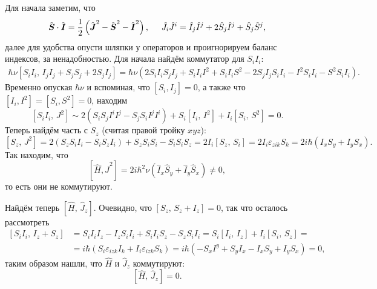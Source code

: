 Для начала заметим, что 
\begin{equation*}
    \hat{\mbox{\boldmath $S$}} \cdot \hat{\mbox{\boldmath $I$}} = \frac{1}{2} \left(
        \hat{\mbox{\boldmath $J$}}^2 - \hat{\mbox{\boldmath $S$}}^2 - \hat{\mbox{\boldmath $I$}}^2
    \right),
    \hspace{5 mm} 
    \hat{J}_i \hat{J}^i = \hat{I}_j \hat{I}^j + 2 \hat{S}_j \hat{I}^j + \hat{S}_j \hat{S}^j,
\end{equation*}
далее для удобства опусти шляпки у операторов и проигнорируем баланс индексов, за ненадобностью. Для начала найдём коммутатор для $S_i I_i$:
\begin{align*}
    \hbar \nu \left[
        S_i I_i,\, I_j I_j + S_j S_j + 2 S_j I_j
    \right] = \hbar \nu\left(
        2 S_i I_i S_j I_j + S_i I_i I^2 + S_i I_i S^2 - 
        2 S_j I_j S_i I_i - I^2 S_i I_i - S^2 S_i I_i
    \right).
\end{align*}
Временно опуская $\hbar \nu$ и вспоминая, что $[S_i, I_j] = 0$, а также что $[I_i, I^2] = [S_i, S^2] = 0$, находим
\begin{equation*}
    \left[S_i I_i,\, J^2\right] \sim 
    2 \left(
        S_i S_j I^i I^j - S_j S_i I^j I^i
    \right) + S_i \left[I_i,\,  I^2\right] + I_i\left[S_i,\,  S^2\right] = 0.
\end{equation*}
Теперь найдём часть с $S_z$ (считая правой тройку $xyz$):
\begin{equation*}
    \left[S_z,\, J^2\right] = 
    2 (S_z S_i I_i - S_i S_z I_i) + S_z S_i S_i - S_i S_i S_z = 
    2 I_i \left[S_z,\, S_i\right] = 2 I_i \varepsilon_{z i k} S_k = 
    2 i \hbar \left(I_x S_y + I_y S_x\right).
\end{equation*}
Так находим, что
\begin{equation*}
    \left[\hat{H}, \hat{J}^2\right] = 2 i \hbar^2 \nu \left(\hat{I}_x \hat{S}_y + \hat{I}_y \hat{S}_x\right) \neq 0,
\end{equation*}
то есть они не коммутируют.


Найдём теперь $\left[\hat{H},\, \hat{J}_z\right]$. Очевидно, что $[S_z,\, S_z + I_z] = 0$, так что осталось рассмотреть
\begin{align*}
    \left[S_i I_i,\, I_z + S_z\right] 
    &= 
    S_i I_i I_z - I_z S_i I_i + S_i I_i S_z - S_z S_i I_i 
    = 
    S_i \left[I_i,\, I_z\right] + I_i \left[S_i,\, S_z\right] 
    = \\ &=
    i \hbar \left(
        S_i \varepsilon_{izk} I_k + I_i \varepsilon_{izk} S_k
    \right) = i\hbar\left(
        - S_x I^y + S_y I_x - I_x S_y + I_y S_x
    \right) = 0,
\end{align*}
таким образом нашли, что $\hat{H}$ и $\hat{J}_z$ коммутируют:
\begin{equation*}
    \left[\hat{H},\, \hat{J}_z\right] = 0.
\end{equation*}


